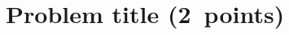 \documentclass[11pt,a4paper,twoside,english,solution]{teaching}
\begin{document}

\section{Problem title (2~points)}
\end{document}
